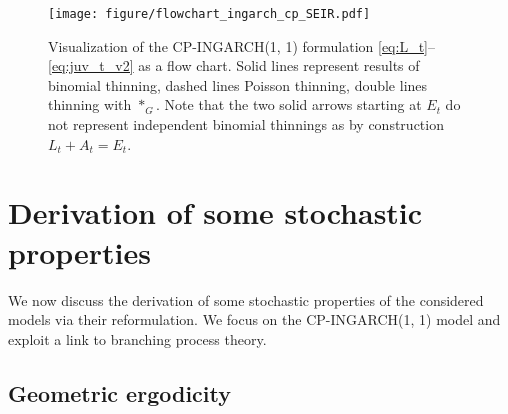 \documentclass{article}
\begin{document}
\begin{figure}[h!]
\center
\texttt{[image: figure/flowchart\_ingarch\_cp\_SEIR.pdf]}
\caption{Visualization of the CP-INGARCH(1, 1) formulation \eqref{eq:L_t}--\eqref{eq:juv_t_v2} as a flow chart. Solid lines represent results of binomial thinning, dashed lines Poisson thinning, double lines thinning with $*_G$. Note that the two solid arrows starting at $E_t$ do not represent independent binomial thinnings as by construction  $L_t + A_t = E_t$.}
\label{fig:ingarch_flowchart}
\end{figure}



\section{Derivation of some stochastic properties}

We now discuss the derivation of some stochastic properties of the considered models via their reformulation. We focus on the CP-INGARCH(1, 1) model and exploit a link to branching process theory.

\subsection{Geometric ergodicity}
\end{document}
